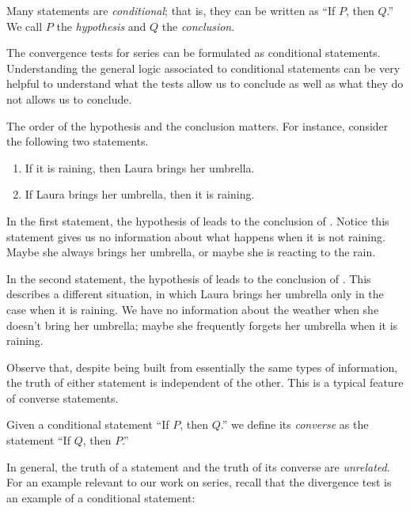\documentclass{ximera}
\author{Hans Parshall}
\begin{document}
\begin{exercise}
Many statements are \emph{conditional}; that is, they can be written as ``If $P$, then $Q$.''  We call $P$ the \emph{hypothesis} and $Q$ the \emph{conclusion}.  

The convergence tests for series can be formulated as conditional statements.  Understanding the general logic associated to conditional statements can be very helpful to understand what the tests allow us to conclude as well as what they do not allows us to conclude.

The order of the hypothesis and the conclusion matters.  For instance, consider the following two statements.
\begin{enumerate}
\item If it is raining, then Laura brings her umbrella.
\item If Laura brings her umbrella, then it is raining.
\end{enumerate}
In the first statement, the hypothesis of
leads to the conclusion of
.
Notice this statement gives us no information about what happens when it is not raining.  Maybe she always brings her umbrella, or maybe she is reacting to the rain.

In the second statement, the hypothesis of
leads to the conclusion of
.
This describes a different situation, in which Laura brings her umbrella only in the case when it is raining.  We have no information about the weather when she doesn't bring her umbrella; maybe she frequently forgets her umbrella when it is raining.

Observe that, despite being built from essentially the same types of information, the truth of either statement is independent of the other.  This is a typical feature of converse statements.

\begin{definition}
Given a conditional statement ``If $P$, then $Q$.'' we define its \emph{converse} as the statement ``If $Q$, then $P$.''
\end{definition}

In general, the truth of a statement and the truth of its converse are \emph{unrelated}.  For an example relevant to our work on series, recall that the divergence test is an example of a conditional statement:



\end{exercise}
\end{document}
